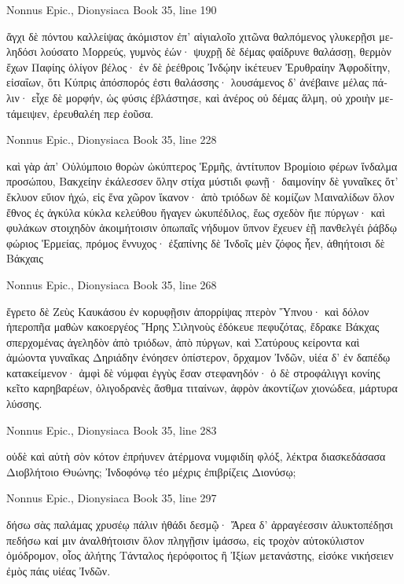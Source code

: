 \documentclass[12pt,letterpaper,twoside,final]{memoir}
\begin{document}
\begin{greek}
Nonnus Epic., Dionysiaca 
Book 35, line 190

                                  ἄγχι δὲ πόντου 
καλλείψας ἀκόμιστον ἐπ' αἰγιαλοῖο χιτῶνα 
θαλπόμενος γλυκερῇσι μεληδόσι λούσατο Μορρεύς, 
γυμνὸς ἐών· ψυχρῇ δὲ δέμας φαίδρυνε θαλάσσῃ, 
θερμὸν ἔχων Παφίης ὀλίγον βέλος· ἐν δὲ ῥεέθροις 
Ἰνδῴην ἱκέτευεν Ἐρυθραίην Ἀφροδίτην, 
εἰσαΐων, ὅτι Κύπρις ἀπόσπορός ἐστι θαλάσσης· 
λουσάμενος δ' ἀνέβαινε μέλας πάλιν· εἶχε δὲ μορφήν, 
ὡς φύσις ἐβλάστησε, καὶ ἀνέρος οὐ δέμας ἅλμη, 
οὐ χροιὴν μετάμειψεν, ἐρευθαλέη περ ἐοῦσα. 



Nonnus Epic., Dionysiaca 
Book 35, line 228

καὶ γὰρ ἀπ' Οὐλύμποιο θορὼν ὠκύπτερος Ἑρμῆς, 
ἀντίτυπον Βρομίοιο φέρων ἴνδαλμα προσώπου, 
Βακχείην ἐκάλεσσεν ὅλην στίχα μύστιδι φωνῇ· 
δαιμονίην δὲ γυναῖκες ὅτ' ἔκλυον εὔιον ἠχώ, 
εἰς ἕνα χῶρον ἵκανον· ἀπὸ τριόδων δὲ κομίζων 
Μαιναλίδων ὅλον ἔθνος ἐς ἀγκύλα κύκλα κελεύθου 
ἤγαγεν ὠκυπέδιλος, ἕως σχεδὸν ἤιε πύργων· 
καὶ φυλάκων στοιχηδὸν ἀκοιμήτοισιν ὀπωπαῖς 
νήδυμον ὕπνον ἔχευεν ἑῇ πανθελγέι ῥάβδῳ 
φώριος Ἑρμείας, πρόμος ἔννυχος· ἐξαπίνης δὲ 
Ἰνδοῖς μὲν ζόφος ἦεν, ἀθηήτοισι δὲ Βάκχαις 




Nonnus Epic., Dionysiaca 
Book 35, line 268

                                       ἔγρετο δὲ Ζεὺς 
Καυκάσου ἐν κορυφῇσιν ἀπορρίψας πτερὸν Ὕπνου· 
καὶ δόλον ἠπεροπῆα μαθὼν κακοεργέος Ἥρης 
Σιληνοὺς ἐδόκευε πεφυζότας, ἔδρακε Βάκχας 
σπερχομένας ἀγεληδὸν ἀπὸ τριόδων, ἀπὸ πύργων, 
καὶ Σατύρους κείροντα καὶ ἀμώοντα γυναῖκας 
Δηριάδην ἐνόησεν ὀπίστερον, ὄρχαμον Ἰνδῶν, 
υἱέα δ' ἐν δαπέδῳ κατακείμενον· ἀμφὶ δὲ νύμφαι   
ἐγγὺς ἔσαν στεφανηδόν· ὁ δὲ στροφάλιγγι κονίης 
κεῖτο καρηβαρέων, ὀλιγοδρανὲς ἄσθμα τιταίνων, 
ἀφρὸν ἀκοντίζων χιονώδεα, μάρτυρα λύσσης. 



Nonnus Epic., Dionysiaca 
Book 35, line 283

                                         οὐδὲ καὶ αὐτὴ 
σὸν κότον ἐπρήυνεν ἀτέρμονα νυμφιδίη φλόξ, 
λέκτρα διασκεδάσασα Διοβλήτοιο Θυώνης; 
Ἰνδοφόνῳ τέο μέχρις ἐπιβρίζεις Διονύσῳ; 



Nonnus Epic., Dionysiaca 
Book 35, line 297

δήσω σὰς παλάμας χρυσέῳ πάλιν ἠθάδι δεσμῷ· 
Ἄρεα δ' ἀρραγέεσσιν ἀλυκτοπέδῃσι πεδήσω   
καί μιν ἀναλθήτοισιν ὅλον πληγῇσιν ἱμάσσω, 
εἰς τροχὸν αὐτοκύλιστον ὁμόδρομον, οἷος ἀλήτης 
Τάνταλος ἠερόφοιτος ἢ Ἰξίων μετανάστης, 
εἰσόκε νικήσειεν ἐμὸς πάις υἱέας Ἰνδῶν. 




\end{greek}
\end{document}
